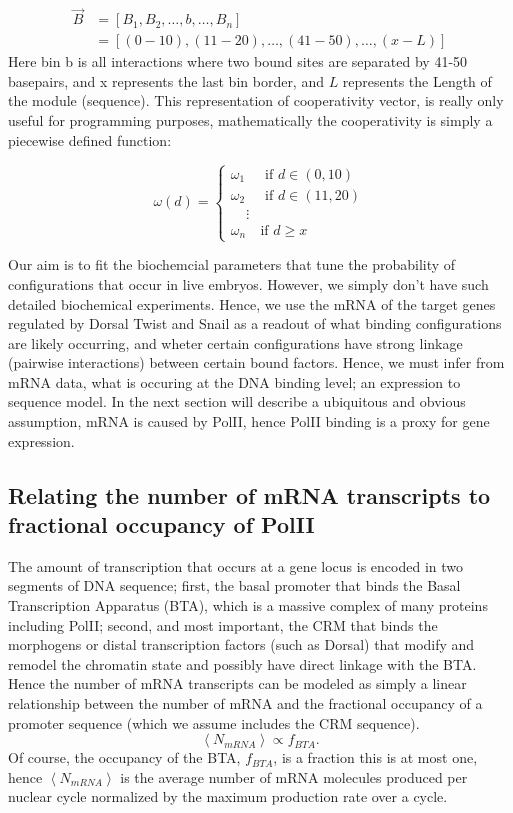 \begin{equation}\label{}
\begin{split}
 \overrightarrow{B}   &= [ B_1 ,B_2 ,\ldots, b, \ldots, B_n ] \\
     &=   [ (0-10), (11-20), \ldots,(41-50),\ldots, (x-L)]
    \end{split}
\end{equation}
Here bin b is all interactions where two bound sites are separated by 41-50 basepairs, and x represents the last bin border, and $L$ represents the Length of the module (sequence).  This representation of cooperativity vector, is really only useful for programming purposes, mathematically the cooperativity is simply a piecewise defined function:


\[
  \omega(d) =
  \begin{cases}
   \omega_1  & \text{ if } d \in (0,10)  \\
   \omega_2  & \text{ if } d \in (11,20)  \\
   \ \ \ \ \ \vdots \\
 \omega_n  & \text{if } d \geq x
  \end{cases}
\]

Our aim is to fit the biochemcial parameters that tune the probability of configurations that occur in live embryos.  However, we simply don't have such detailed biochemical experiments.  Hence, we use the mRNA of the target genes regulated by Dorsal Twist and Snail as a readout of what binding configurations are likely occurring, and wheter certain configurations have strong linkage (pairwise interactions) between certain bound factors.  Hence, we must infer from mRNA data, what is occuring at the DNA binding level; an expression to sequence model.  In the next section will describe a ubiquitous and obvious assumption, mRNA is caused by PolII, hence PolII binding is a proxy for gene expression.
 
\subsection{Relating the number of mRNA transcripts to fractional occupancy of PolII }
The amount of transcription that occurs at a gene locus is encoded in two segments of DNA sequence; first, the basal promoter that binds the Basal Transcription Apparatus (BTA), which is a massive complex of many proteins including PolII; second, and most important, the CRM that binds the morphogens or distal transcription factors (such as Dorsal) that modify and remodel the chromatin state and possibly have direct linkage with the BTA.  Hence the number of mRNA transcripts can be modeled as simply a linear relationship between the number of mRNA and the fractional occupancy of a promoter sequence (which we assume includes the CRM sequence).
\begin{equation}\label{}
     \left< N_{mRNA} \right>  \propto f_{BTA}.
\end{equation}
Of course, the occupancy of the BTA, $f_{BTA}$,  is a fraction this is at most one, hence $\left< N_{mRNA} \right> $ is the average number of mRNA molecules produced per nuclear cycle normalized by the maximum production rate over a cycle. 



 


